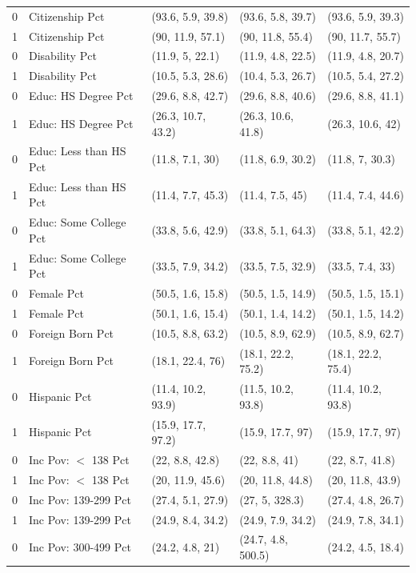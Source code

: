 \begin{table}[h!]
\begin{tabular}{rllll}
  0 & Citizenship Pct & (93.6, 5.9, 39.8) & (93.6, 5.8, 39.7) & (93.6, 5.9, 39.3) \\ 
  1 & Citizenship Pct & (90, 11.9, 57.1) & (90, 11.8, 55.4) & (90, 11.7, 55.7) \\ 
  0 & Disability Pct & (11.9, 5, 22.1) & (11.9, 4.8, 22.5) & (11.9, 4.8, 20.7) \\ 
  1 & Disability Pct & (10.5, 5.3, 28.6) & (10.4, 5.3, 26.7) & (10.5, 5.4, 27.2) \\ 
  0 & Educ: HS Degree Pct & (29.6, 8.8, 42.7) & (29.6, 8.8, 40.6) & (29.6, 8.8, 41.1) \\ 
  1 & Educ: HS Degree Pct & (26.3, 10.7, 43.2) & (26.3, 10.6, 41.8) & (26.3, 10.6, 42) \\ 
  0 & Educ: Less than HS Pct & (11.8, 7.1, 30) & (11.8, 6.9, 30.2) & (11.8, 7, 30.3) \\ 
  1 & Educ: Less than HS Pct & (11.4, 7.7, 45.3) & (11.4, 7.5, 45) & (11.4, 7.4, 44.6) \\ 
  0 & Educ: Some College Pct & (33.8, 5.6, 42.9) & (33.8, 5.1, 64.3) & (33.8, 5.1, 42.2) \\ 
  1 & Educ: Some College Pct & (33.5, 7.9, 34.2) & (33.5, 7.5, 32.9) & (33.5, 7.4, 33) \\ 
  0 & Female Pct & (50.5, 1.6, 15.8) & (50.5, 1.5, 14.9) & (50.5, 1.5, 15.1) \\ 
  1 & Female Pct & (50.1, 1.6, 15.4) & (50.1, 1.4, 14.2) & (50.1, 1.5, 14.2) \\ 
  0 & Foreign Born Pct & (10.5, 8.8, 63.2) & (10.5, 8.9, 62.9) & (10.5, 8.9, 62.7) \\ 
  1 & Foreign Born Pct & (18.1, 22.4, 76) & (18.1, 22.2, 75.2) & (18.1, 22.2, 75.4) \\ 
  0 & Hispanic Pct & (11.4, 10.2, 93.9) & (11.5, 10.2, 93.8) & (11.4, 10.2, 93.8) \\ 
  1 & Hispanic Pct & (15.9, 17.7, 97.2) & (15.9, 17.7, 97) & (15.9, 17.7, 97) \\ 
  0 & Inc Pov: $<$ 138 Pct & (22, 8.8, 42.8) & (22, 8.8, 41) & (22, 8.7, 41.8) \\ 
  1 & Inc Pov: $<$ 138 Pct & (20, 11.9, 45.6) & (20, 11.8, 44.8) & (20, 11.8, 43.9) \\ 
  0 & Inc Pov: 139-299 Pct & (27.4, 5.1, 27.9) & (27, 5, 328.3) & (27.4, 4.8, 26.7) \\ 
  1 & Inc Pov: 139-299 Pct & (24.9, 8.4, 34.2) & (24.9, 7.9, 34.2) & (24.9, 7.8, 34.1) \\ 
  0 & Inc Pov: 300-499 Pct & (24.2, 4.8, 21) & (24.7, 4.8, 500.5) & (24.2, 4.5, 18.4) \\ 

\end{tabular}
\end{table}
